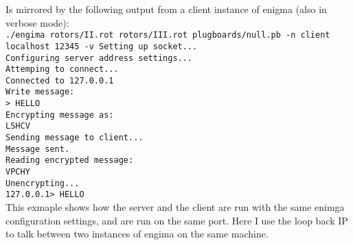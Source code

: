 \documentclass[11pt, notitlepage]{report}
\begin{document}
Is mirrored by the following output from a client instance of enigma (also in 
verbose mode):\\

\texttt{./engima rotors/II.rot rotors/III.rot plugboards/null.pb -n client localhost 12345 -v
        Setting up socket...\\
        Configuring server address settings...\\
        Attemping to connect...\\
        Connected to 127.0.0.1\\
        Write message:\\
        > HELLO\\
        Encrypting message as:\\
        LSHCV \\
        Sending message to client...\\
        Message sent.\\
        Reading encrypted message:\\
        VPCHY \\
        Unencrypting...\\
        127.0.0.1> HELLO}\\

This exmaple shows how the server and the client are run with the same enimga 
configuration settings, and are run on the same port. Here I use the loop back 
IP to talk between two instances of engima on the same machine.
\end{document}
